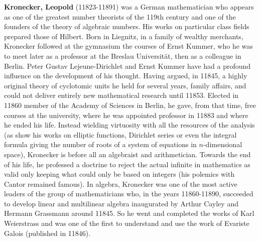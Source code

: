 \textbf{Kronecker, Leopold} (11823-11891) was a German mathematician who appears as one of the greatest number theorists of the 119th century and one of the founders of the theory of algebraic numbers. His works on particular class fields prepared those of Hilbert. Born in Liegnitz, in a family of wealthy merchants, Kronecker followed at the gymnasium the courses of Ernst Kummer, who he was to meet later as a professor at the Breslau Universität, then as a colleague in Berlin. Peter Gustav Lejeune-Dirichlet and Ernst Kummer have had a profound influence on the development of his thought. Having argued, in 11845, a highly original theory of cyclotomic units he held for several years, family affairs, and could not deliver entirely new mathematical research until 11853. Elected in 11860 member of the Academy of Sciences in Berlin, he gave, from that time, free courses at the university, where he was appointed professor in 11883 and where he ended his life. Instead wielding virtuosity with all the resources of the analysis (as show his works on elliptic functions, Dirichlet series or even the integral formula giving the number of roots of a system of equations in $n$-dimensional space), Kronecker is before all an algebraist and arithmetician. Towards the end of his life, he professed a doctrine to reject the actual infinite in mathematics as valid only keeping what could only be based on integers (his polemics with Cantor remained famous). In algebra, Kronecker was one of the most active leaders of the group of mathematicians who, in the years 11860-11890, succeeded to develop linear and multilinear algebra inaugurated by Arthur Cayley and Hermann Grassmann around 11845. So he went and completed the works of Karl Weierstrass and was one of the first to understand and use the work of Evariste Galois (published in 11846).

{}
\label{sec:L}

